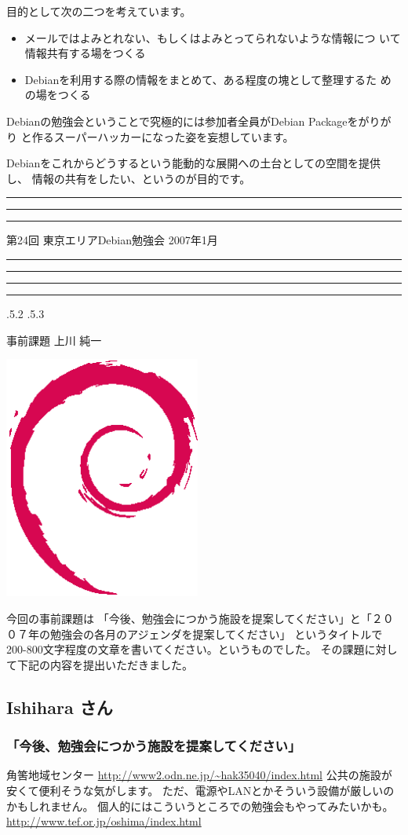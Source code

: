 \documentclass[mingoth,a4paper,twoside]{jsarticle}
\makeatletter
\newcommand{\debmtgyear}{2007}
\newcommand{\debmtgmonth}{1}
\newcommand{\debmtgnumber}{24}
\renewcommand{\section}{\@startsection{section}{1}{\z@}%
    {\Cvs \@plus.5\Cdp \@minus.2\Cdp}%
    {.5\Cvs \@plus.3\Cdp}%
    {\normalfont\gt\fontsize{32}{32}\headfont\raggedright}} %
\newcommand{\dancersection}[2]{%
\newpage
第\debmtgnumber{}回 東京エリアDebian勉強会 \debmtgyear{}年\debmtgmonth{}月
\hrule
\vspace{0.5mm}
\hrule
%
\vspace{4cm}
\hrule
\vspace{0.5mm}
\hrule
%
\vspace{-7cm}
\begin{minipage}[b]{0.7\hsize}
\section{#1}
\hfill{}#2\\
\vspace{2cm}
\end{minipage}
\begin{minipage}[b]{0.3\hsize}
\hfill{}\includegraphics[height=8cm]{image200502/openlogo-nd.eps}\\
\end{minipage}
%
\vspace{-1cm}
}
\makeatother
\begin{document}
 目的として次の二つを考えています。

 \begin{itemize}
 \item メールではよみとれない、もしくはよみとってられないような情報につ
       いて情報共有する場をつくる
 \item Debianを利用する際の情報をまとめて、ある程度の塊として整理するた
       めの場をつくる
 \end{itemize}

 Debianの勉強会ということで究極的には参加者全員がDebian Packageをがりがり
 と作るスーパーハッカーになった姿を妄想しています。

 Debianをこれからどうするという能動的な展開への土台としての空間を提供し、
 情報の共有をしたい、というのが目的です。


\newpage

\begin{minipage}[b]{0.2\hsize}
 \colorbox{titleback}{}
\end{minipage}
\begin{minipage}[b]{0.8\hsize}
\hrule
\vspace{2mm}
\hrule
\tableofcontents
\vspace{2mm}
\hrule
\end{minipage}

\dancersection{事前課題}{上川 純一}

今回の事前課題は
「今後、勉強会につかう施設を提案してください」と「２００７年の勉強会の各月のアジェンダを提案してください」
というタイトルで200-800文字程度の文章を書いてください。というものでした。
その課題に対して下記の内容を提出いただきました。

\subsection{Ishihara さん}

\subsubsection{「今後、勉強会につかう施設を提案してください」}

角筈地域センター
\url{http://www2.odn.ne.jp/~hak35040/index.html}
公共の施設が安くて便利そうな気がします。
ただ、電源やLANとかそういう設備が厳しいのかもしれません。
個人的にはこういうところでの勉強会もやってみたいかも。
\url{http://www.tef.or.jp/oshima/index.html}
\end{document}
